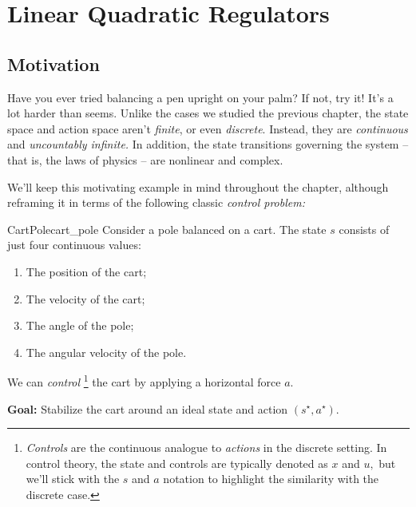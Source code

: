 \documentclass[../main/main]{subfiles}
\begin{document}
    
\chapter[LQR]{Linear Quadratic Regulators}

\begingroup
\renewcommand{\clearpage}{\relax}
\tableofcontents
\endgroup

\section{Motivation}

Have you ever tried balancing a pen upright on your palm?
If not, try it! It's a lot harder than seems.
Unlike the cases we studied the previous chapter,
the state space and action space aren't \emph{finite}, or even \emph{discrete}.
Instead, they are \emph{continuous} and \emph{uncountably infinite.}
In addition, the state transitions governing the system -- that is, the laws of physics --
are nonlinear and complex.

We'll keep this motivating example in mind throughout the chapter,
although reframing it in terms of the following classic \emph{control problem:}

\begin{example}{CartPole}{cart_pole}
    Consider a pole balanced on a cart.
    The state $s$ consists of just four continuous values:

    \begin{enumerate}
        \item The position of the cart;
        \item The velocity of the cart;
        \item The angle of the pole;
        \item The angular velocity of the pole.
    \end{enumerate}

    \noindent
    We can \emph{control}
    \footnote{\emph{Controls} are the continuous analogue to \emph{actions} in the discrete setting. In control theory, the state and controls are typically denoted as
    $x$ and $u,$ but we'll stick with the $s$ and $a$ notation to highlight the
    similarity with the discrete case.}
    the cart by applying a horizontal force $a$.

    \noindent
    \textbf{Goal:} Stabilize the cart around an ideal state and action $(s^\star, a^\star)$.
\end{example}
\end{document}
